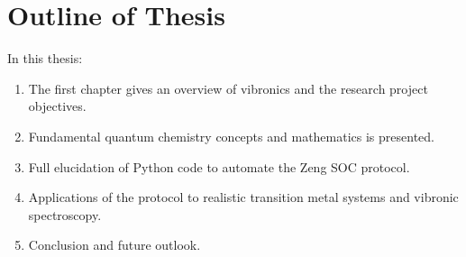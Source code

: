 
\section{Outline of Thesis}
In this thesis:
\begin{enumerate}
    \item The first chapter gives an overview of vibronics and the research project objectives.
    \item Fundamental quantum chemistry concepts and mathematics is presented.
    \item Full elucidation of Python code to automate the Zeng SOC protocol.
    \item Applications of the protocol to realistic transition metal systems and vibronic spectroscopy. 
    \item Conclusion and future outlook.
\end{enumerate}

\cleardoublepage




